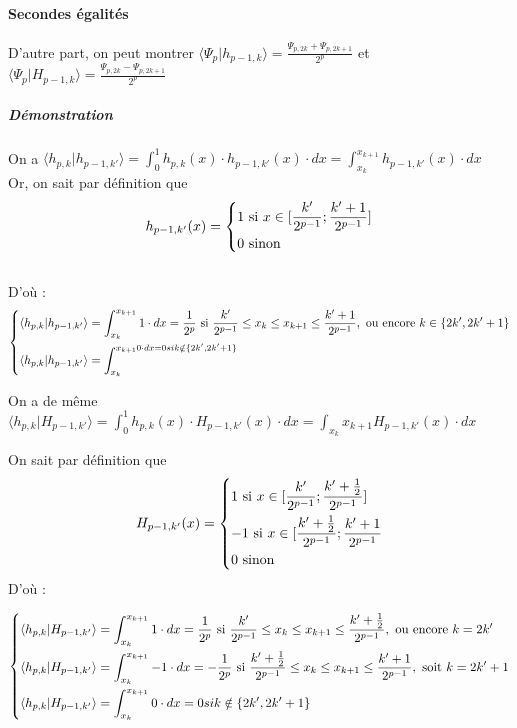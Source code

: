 \documentclass{article}
\begin{document}
\paragraph{Secondes égalités}

D'autre part, on peut montrer $\displaystyle \langle{}\Psi{}_{p}|h_{p-1,k}\rangle = \frac{\Psi{}_{p,2k} + \Psi{}_{p,2k + 1} }{2^p}$ et $\displaystyle \langle{}\Psi{}_{p}|H_{p-1,k}\rangle = \frac{\Psi{}_{p,2k} - \Psi{}_{p,2k + 1} }{2^p}$ \\


\subparagraph*{Démonstration} 

On a $\displaystyle \langle{}h_{p,k}|h_{p-1,k'}\rangle = \int_0^1 h_{p,k}(x)\cdot{}h_{p-1,k'}(x)\cdot{}dx = \int_{x_k}^{x_{k+1}}h_{p-1,k'}(x)\cdot{}dx$ \\

Or, on sait par définition que \[ h_{p-1,k'}(x)= \begin{dcases} 1 \text{ si }x \in [\frac{k'}{2^{p-1}};\frac{k'+1}{2^{p-1}}] \\
0 \text{ sinon } \end{dcases} \]\\
D'où :
\[ \begin{dcases}
\langle{}h_{p,k}|h_{p-1,k'}\rangle = \int_{x_k}^{x_{k+1}}1\cdot{}dx
= \frac{1}{2^p} \text{ si } \frac{k'}{2^{p-1}} \leq x_k \leq x_{k+1} \leq \frac{k'+1}{2^{p-1}}, \text{ ou encore } k \in \{2k',2k'+1\}\\ 
\langle{}h_{p,k}|h_{p-1,k'}\rangle = \int_{x_k}^{x_{k+1}0\cdot{}dx = 0 si k \notin \{2k',2k'+1\}}
\end{dcases} \]

On a de même \\
 $\displaystyle \langle{}h_{p,k}|H_{p-1,k'}\rangle = \int_0^{1}h_{p,k}(x)\cdot{}H_{p-1,k'}(x)\cdot{}dx = \int_{x_k}^{}x_{k+1}H_{p-1,k'}(x)\cdot{}dx$

On sait par définition que \[ H_{p-1,k'}(x) = \begin{dcases} 
1 \text{ si } x \in [\frac{k'}{2^{p-1}};\frac{k'+\frac{1}{2}}{2^{p-1}}] \\
-1 \text{ si } x \in [\frac{k'+\frac{1}{2}}{2^{p-1}};\frac{k'+1}{2^{p-1}} \\
0 \text{ sinon }
\end{dcases}
\] D'où :

\[ \begin{dcases}
\langle{}h_{p,k}|H_{p-1,k'}\rangle = \int_{x_k}^{x_{k+1}}1\cdot{}dx = \frac{1}{2^p} \text{ si } \frac{k'}{2^{p-1}} \leq x_k \leq x_{k+1} \leq \frac{k'+\frac{1}{2}}{2^{p-1}}, \text{ ou encore } k = 2k' \\
\langle{}h_{p,k}|H_{p-1,k'}\rangle = \int_{x_k}^{x_{k+1}}-1\cdot{}dx = -\frac{1}{2^p} \text{ si } \frac{k'+\frac{1}{2}}{2^{p-1}} \leq x_k \leq x_{k+1} \leq \frac{k'+1}{2^{p-1}}, \text{ soit } k = 2k'+1 \\
\langle{}h_{p,k}|H_{p-1,k'}\rangle = \int_{x_k}^{x_{k+1}}0\cdot{}dx = 0 si k \notin \{2k',2k'+1\}
\end{dcases}
\]
\end{document}
